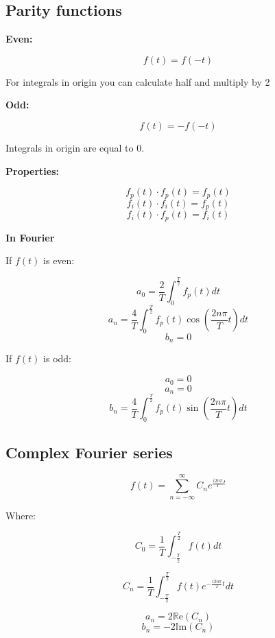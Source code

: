 \documentclass[letterpaper]{article}
\newcommand{\divline}{\noindent\makebox[\linewidth]{\rule{\textwidth}{0.4pt}}}
\begin{document}
	\divline
	
	\begin{multicols}{3}
		\section{Parity functions}
		
		\textbf{Even:}
		
		\[f(t) = f(-t)\]
		
		For integrals in origin you can calculate half and multiply by 2
		
		\textbf{Odd:}
		
		\[f(t) = - f(-t)\]
		
		Integrals in origin are equal to 0.
		
		\textbf{Properties:}
		
		\[f_{p}(t) \cdot f_{p}(t) = f_{p}(t)\]
		\[f_{i}(t) \cdot f_{i}(t) = f_{p}(t)\]
		\[f_{i}(t) \cdot f_{p}(t) = f_{i}(t)\]
		
		\textbf{In Fourier}
		
		If \(f(t)\) is even:
		
		\[a_{0} = \frac{2}{T} \int_{0}^{\frac{T}{2}} f_{p}(t) dt \]
		\[a_{n} = \frac{4}{T} \int_{0}^{\frac{T}{2}} f_{p}(t) \cos{(\frac{2 n \pi}{T} t)} dt \]
		\[b_{n} = 0\]
		
		If \(f(t)\) is odd:
		
		\[a_{0} = 0\]
		\[a_{n} = 0\]
		\[b_{n} = \frac{4}{T} \int_{0}^{\frac{T}{2}} f_{p}(t) \sin{(\frac{2 n \pi}{T} t)} dt \]
		
	\end{multicols}
	
	\divline
	
	\begin{multicols}{2}
		
		\section{Complex Fourier series}
		
		\[f(t) = \sum_{n = - \infty}^{\infty} C_{n} e^{\frac{i2n\pi}{T} t} \]
		
		Where:
		
		\[C_{0} = \frac{1}{T} \int_{-\frac{T}{2}}^{\frac{T}{2}} f(t)dt \]
		
		\[C_{n} = \frac{1}{T} \int_{-\frac{T}{2}}^{\frac{T}{2}} f(t) e^{-\frac{i2n\pi}{T}t} dt \]
		
		\[a_{n} = 2 \mathbb{R}\text{e}(C_{n})\]
		\[b_{n} = - 2 \mathbb{I}\text{m}(C_{n})\]
		
	\end{multicols}
	
	\divline
	
\end{document}
